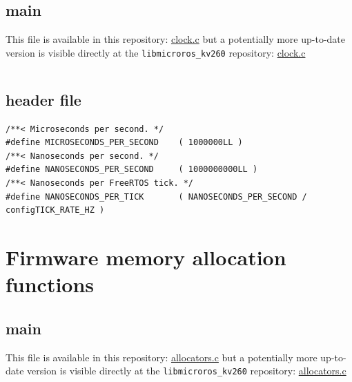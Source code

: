 \documentclass[10pt]{article}
\begin{document}
\subsection{main}
\label{sec:orgb2cff9a}
This file is available in this repository: \href{https://gitlab.com/sunoc/xilinx-kria-kv260-documentation/-/blob/b7300116e153f4b5a1542f8804e4646db8030033/src/clock.c}{clock.c}
but a potentially more up-to-date version is visible
directly at the \texttt{libmicroros\_kv260} repository: \href{https://gitlab.com/sunoc/libmicroros\_kv260/-/blob/4867e762f66af7b4647232eb4c0a31106db66e13/src/clock.c}{clock.c}

\inputminted[linenos, frame=single]{c}{./src/clock.c}

\subsection{header file}
\label{sec:org9af9ce0}
\begin{verbatim}
/**< Microseconds per second. */
#define MICROSECONDS_PER_SECOND    ( 1000000LL )  
/**< Nanoseconds per second. */
#define NANOSECONDS_PER_SECOND     ( 1000000000LL ) 
/**< Nanoseconds per FreeRTOS tick. */  
#define NANOSECONDS_PER_TICK       ( NANOSECONDS_PER_SECOND / configTICK_RATE_HZ ) 
\end{verbatim}


\clearpage
\section{Firmware memory allocation functions}
\label{sec:org8f3f246}

\subsection{main}
\label{sec:orgfb0740c}
This file is available in this repository: \href{https://gitlab.com/sunoc/xilinx-kria-kv260-documentation/-/blob/b7300116e153f4b5a1542f8804e4646db8030033/src/allocators.c}{allocators.c}
but a potentially more up-to-date version is visible
directly at the \texttt{libmicroros\_kv260} repository: \href{https://gitlab.com/sunoc/libmicroros\_kv260/-/blob/4867e762f66af7b4647232eb4c0a31106db66e13/src/allocators.c}{allocators.c}

\inputminted[linenos, frame=single]{c}{./src/allocators.c}
\end{document}
